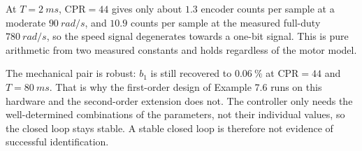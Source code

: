 At \(T=\SI{2}{ms}\), \(\mathrm{CPR}=44\) gives only about \(1.3\) encoder
counts per sample at a moderate \(\SI{90}{rad/s}\), and \(10.9\) counts per
sample at the measured full-duty \(\SI{780}{rad/s}\), so the speed signal
degenerates towards a one-bit signal. This is pure arithmetic from two
measured constants and holds regardless of the motor model.

The mechanical pair is robust: \(b_1\) is still recovered to
\(\SI{0.06}{\percent}\) at \(\mathrm{CPR}=44\) and \(T=\SI{80}{ms}\). That is
why the first-order design of Example 7.6 runs on this hardware and the
second-order extension does not. The controller only needs the
well-determined combinations of the parameters, not their individual values,
so the closed loop stays stable. A stable closed loop is therefore not evidence of successful identification.
